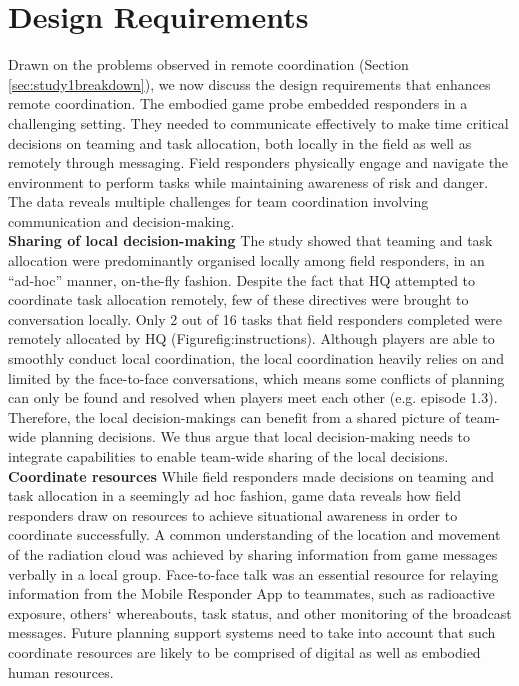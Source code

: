 \section{Design Requirements}\label{sec:study1requirements}
Drawn on the problems observed in remote coordination (Section \ref{sec:study1breakdown}), we now discuss the design requirements that enhances remote coordination. The embodied game probe embedded responders in a challenging setting. They needed to communicate effectively to make time critical decisions on teaming and task allocation, both locally in the field as well as remotely through messaging. Field responders physically engage and navigate the environment to perform tasks while maintaining awareness of risk and danger. The data reveals multiple challenges for team coordination involving communication and decision-making. \\

\textbf{Sharing of local decision-making} The study showed that teaming and task allocation were predominantly organised locally among field responders, in an ``ad-hoc'' manner, on-the-fly fashion. Despite the fact that HQ attempted to coordinate task allocation remotely, few of these directives were brought to conversation locally. Only 2 out of 16 tasks that field responders completed were remotely allocated by HQ (Figure{fig:instructions}). Although players are able to smoothly conduct local coordination, the local coordination heavily relies on and limited by the face-to-face conversations, which means some conflicts of planning can only be found and resolved when players meet each other (e.g. episode 1.3). Therefore, the local decision-makings can benefit from a shared picture of team-wide planning decisions. We thus argue that local decision-making needs to integrate capabilities to enable team-wide sharing of the local decisions.\\

\textbf{Coordinate resources} While field responders made decisions on teaming and task allocation in a seemingly ad hoc fashion, game data reveals how field responders draw on resources to achieve situational awareness in order to coordinate successfully. A common understanding of the location and movement of the radiation cloud was achieved by sharing information from game messages verbally in a local group. Face-to-face talk was an essential resource for relaying information from the Mobile Responder App to teammates, such as radioactive exposure, others` whereabouts, task status, and other monitoring of the broadcast messages. Future planning support systems need to take into account that such coordinate resources are likely to be comprised of digital as well as embodied human resources. \\

